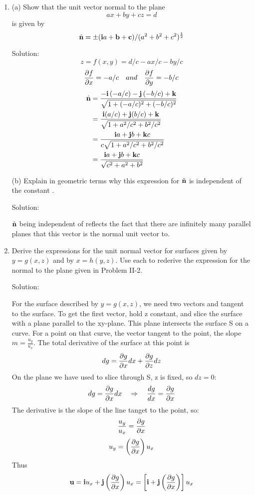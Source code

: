 \documentclass{article}
\begin{document}
\begin{enumerate}
    \item (a) Show that the unit vector normal to the plane
    \[ ax + by + cz = d \]
    is given by
    \[ \hat{\bb{n}} = \pm (\bb{i}a +\bb{b} + \bb{c})/(a^2 + b^2 + c^2)^\frac{1}{2}\]

    Solution:
    \[ z = f(x,y) = d/c - ax/c - by/c \]
    \[ \pd{x} = -a/c \quad and \quad \pd{y} = -b/c \]
    \begin{align*}
        \nhat{-a/c}{-b/c} \\
        &= \frac{\bb{i}(a/c) + \bb{j}(b/c) + \bb{k}}{\sqrt{1 + a^2/c^2 + b^2/c^2}} \\
        &= \frac{\bb{i}a + \bb{j}b + \bb{k}c}{c\sqrt{1 + a^2/c^2 + b^2/c^2}} \\
        &= \frac{\bb{i}a + \bb{j}b + \bb{k}c}{\sqrt{c^2 + a^2 + b^2}} \\
    \end{align*}

    (b) Explain in geometric terms why this expression for $\hat{\bb{n}}$
    is independent of the constant .

    Solution:

    $\hat{\bb{n}}$ being independent of  reflects the fact that there are
    infinitely many parallel planes that this vector is the normal unit vector
    to.

    \item Derive the expressions for the unit normal vector for surfaces
    given by $y=g(x,z)$ and by $x=h(y,z)$. Use each to rederive the expression
    for the normal to the plane given in Problem II-2.

    Solution:

    For the surface described by $y=g(x,z)$, we need two vectors  and
     tangent to the surface. To get the first vector, hold z constant,
    and slice the surface with a plane parallel to the xy-plane. This plane
    intersects the surface S on a curve. For a point on that curve, the vector
     tangent to the point, the slope $m = \frac{u_y}{u_x}$. The total
    derivative of the surface at this point is
    \[ dg = \pd[g]{x}dx + \pd[g]{z}dz \]
    On the plane we have used to slice through S, z is fixed, so $dz = 0$:
    \[ dg = \pd[g]{x}dx \quad \Rightarrow \quad \frac{dg}{dx} = \pd[g]{x} \]
    The derivative is the slope of the line tanget to the point, so:
    \[ \frac{u_y}{u_x} = \pd[g]{x} \]
    \[ u_y = \left( \pd[g]{x} \right)u_x \]
    Thus
    \[ \bb{u} = \bb{i}u_x + \bb{j}\left( \pd[g]{x} \right)u_x = \left[ \bb{i} + \bb{j}\left( \pd[g]{x} \right) \right]u_x \]


\end{enumerate}
\end{document}
